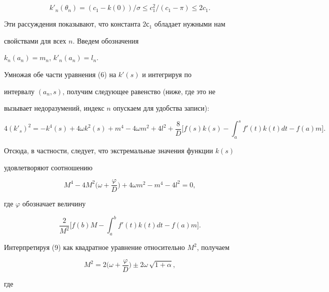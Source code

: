 \begin{pf}
$$


{k}'_n(\theta_n)=(c_1-k(0))/\sigma \le


c_1^2/(c_1-\pi) \le 2c_1.


$$


Эти рассуждения показывают, что константа $2с_1$ обладает нужными нам


свойствами для всех $n$. Введем обозначения


$k_n(a_n)=m_n$, ${k}'_n(a_n)=l_n$.


Умножая обе части уравнения (6) на ${k}'(s)$ и интегрируя по


интервалу $(a_n,s)$, получим следующее равенство (ниже, где это не


вызывает недоразумений, индекс $n$ опускаем для удобства записи):


\begin{equation}


4 ({k}'_s)^2=-k^4(s)+4\omega k^2(s) +m^4-4\omega m^2+4l^2+


\frac{8}{D}\bigg[f(s)k(s)-\int_a^s {f'(t)k(t)dt}-f(a)m \bigg].


\end{equation}


Отсюда, в частности, следует, что экстремальные значения функции $k(s)$


удовлетворяют соотношению


\begin{equation}


M^4-4M^2 \bigg(\omega + \frac{\varphi}{D}\bigg)+4\omega m^2-m^4-4l^2=0,


\end{equation}


где $\varphi$ обозначает величину


$$


\frac{2}{M^2} \bigg[f(b)M-\int_a^b


{f'(t)k(t)dt}-f(a)m \bigg].


$$





Интерпретируя (9) как квадратное уравнение относительно $M^2$, получаем


\begin{equation}


M^2=2 \bigg(\omega +


\frac{\varphi}{D}\bigg) \pm 2\omega\, \sqrt{1+\alpha},


\end{equation}


где



\end{pf}
